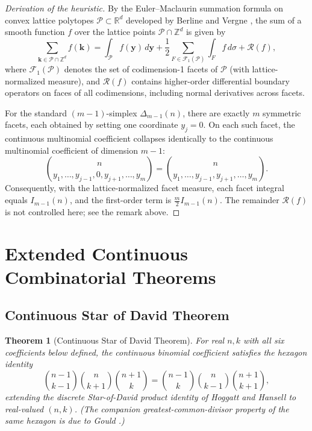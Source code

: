 \documentclass[11pt,a4paper]{article}
\theoremstyle{plain}
\newtheorem{theorem}{Theorem}[section]
\theoremstyle{definition}
\theoremstyle{remark}
\numberwithin{equation}{section}
\begin{document}
\begin{proof}[Derivation of the heuristic]
By the Euler--Maclaurin summation formula on convex lattice polytopes $\mathcal{P} \subset \mathbb{R}^{d}$ developed by Berline and Vergne \cite{berline2007}, the sum of a smooth function $f$ over the lattice points $\mathcal{P} \cap \mathbb{Z}^d$ is given by
\begin{equation}
\sum_{\mathbf{k} \in \mathcal{P} \cap \mathbb{Z}^d} f(\mathbf{k}) = \int_{\mathcal{P}} f(\mathbf{y})\,d\mathbf{y} + \frac{1}{2}\sum_{F \in \mathcal{F}_1(\mathcal{P})} \int_F f\,d\sigma + \mathcal{R}(f),
\end{equation}
where $\mathcal{F}_1(\mathcal{P})$ denotes the set of codimension-1 facets of $\mathcal{P}$ (with lattice-normalized measure), and $\mathcal{R}(f)$ contains higher-order differential boundary operators on faces of all codimensions, including normal derivatives across facets.

For the standard $(m-1)$-simplex $\Delta_{m-1}(n)$, there are exactly $m$ symmetric facets, each obtained by setting one coordinate $y_j = 0$. On each such facet, the continuous multinomial coefficient collapses identically to the continuous multinomial coefficient of dimension $m-1$:
\begin{equation}
\binom{n}{y_1, \dots, y_{j-1}, 0, y_{j+1}, \dots, y_m} = \binom{n}{y_1, \dots, y_{j-1}, y_{j+1}, \dots, y_m}.
\end{equation}
Consequently, with the lattice-normalized facet measure, each facet integral equals $I_{m-1}(n)$, and the first-order term is $\frac{m}{2}I_{m-1}(n)$. The remainder $\mathcal{R}(f)$ is not controlled here; see the remark above.
\end{proof}

\section{Extended Continuous Combinatorial Theorems}

\subsection{Continuous Star of David Theorem}

\begin{theorem}[Continuous Star of David Theorem]
\label{thm:star_of_david}
For real $n, k$ with all six coefficients below defined, the continuous binomial coefficient satisfies the hexagon identity
\begin{equation}
\label{eq:sod_product}
\binom{n-1}{k-1}\binom{n}{k+1}\binom{n+1}{k} = \binom{n-1}{k}\binom{n}{k-1}\binom{n+1}{k+1},
\end{equation}
extending the discrete Star-of-David product identity of Hoggatt and Hansell \cite{hoggatt1971} to real-valued $(n,k)$. (The companion greatest-common-divisor property of the same hexagon is due to Gould \cite{gould1972}.)
\end{theorem}
\end{document}
